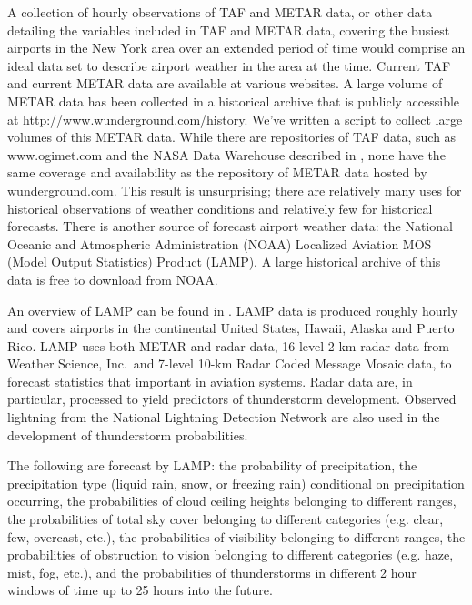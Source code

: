 \documentclass[11pt]{scrartcl}
\begin{document}
A collection of hourly observations of TAF and METAR data, or other data detailing the variables included in TAF and METAR data, covering the busiest airports in the New York area over an extended period of time would comprise an ideal data set to describe airport weather in the area at the time.  Current TAF and current METAR data are available at various websites. A large volume of METAR data has been collected in a historical archive that is publicly accessible at http://www.wunderground.com/history.  We've written a script to collect large volumes of this METAR data. While there are repositories of TAF data, such as www.ogimet.com and the NASA Data Warehouse described in \cite{NASA_data}, none have the same coverage and availability as the repository of METAR data hosted by wunderground.com. This result is unsurprising; there are relatively many uses for historical observations of weather conditions and relatively few for historical forecasts. There is another source of forecast airport weather data: the National Oceanic and Atmospheric Administration (NOAA) Localized Aviation MOS (Model Output Statistics) Product (LAMP). A large historical archive of this data is free to download from NOAA.

An overview of LAMP can be found in \cite{ghirardelli2005overview}.  LAMP data is produced roughly hourly and covers airports in the continental United States, Hawaii, Alaska and Puerto Rico.  LAMP uses both METAR and radar data, 16-level 2-km radar data from Weather Science, Inc.\ and 7-level 10-km Radar Coded Message Mosaic data, to forecast statistics that important in aviation systems. Radar data are, in particular, processed to yield predictors of thunderstorm development.  Observed lightning from the National Lightning Detection Network are also used in the development of thunderstorm probabilities. 

The following are forecast by LAMP: the probability of precipitation, the precipitation type (liquid rain, snow, or freezing rain) conditional on precipitation occurring, the probabilities of cloud ceiling heights belonging to different ranges, the probabilities of total sky cover belonging to different categories (e.g. clear, few, overcast, etc.), the probabilities of visibility belonging to different ranges, the probabilities of obstruction to vision belonging to different categories (e.g. haze, mist, fog, etc.), and the probabilities of thunderstorms in different 2 hour windows of time up to 25 hours into the future.
\end{document}
